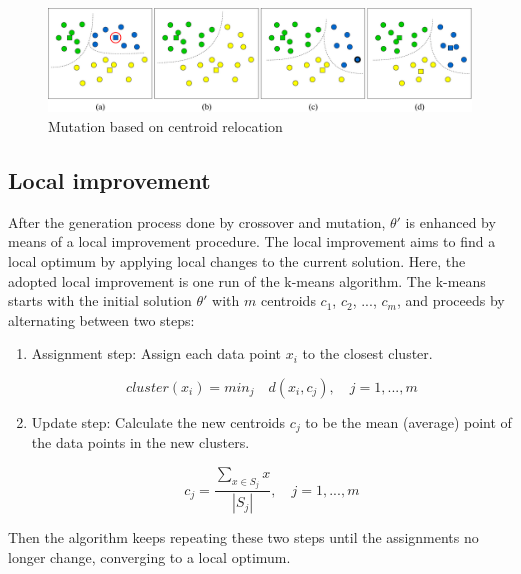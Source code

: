 \begin{figure}[H]
  \begin{center}
    \includegraphics[width=1.0\textwidth]{img/mutation}
    \caption{Mutation based on centroid relocation}\label{fig:mutation}
  \end{center}
\end{figure}

\subsection{Local improvement}
\label{subsec:local-improvement}
After the generation process done by crossover and mutation, $\theta'$ is enhanced by means of a local improvement procedure. The local improvement aims to find a local optimum by applying local changes to the current solution. Here, the adopted local improvement is one run of the k-means algorithm. The k-means starts with the initial solution $\theta'$ with $m$ centroids $c_1$, $c_2$, ..., $c_m$, and proceeds by alternating between two steps:

\begin{enumerate}

	\item Assignment step: Assign each data point $x_i$ to the closest cluster.
	
	\begin{equation}
	cluster(x_i) = min_j \quad d(x_i, c_j), \quad j = 1,...,m
	\end{equation}
	
	\item Update step: Calculate the new centroids $c_j$ to be the mean (average) point of the data points in the new clusters.
	
	\begin{equation}
	c_j = \frac{\sum_{x \in S_j}x}{\left | S_j \right |}, \quad j = 1,...,m
	\end{equation}
		
\end{enumerate}

Then the algorithm keeps repeating these two steps until the assignments no longer change, converging to a local optimum.


